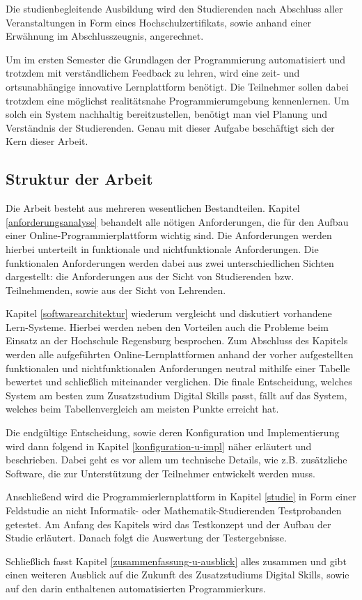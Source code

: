 Die studienbegleitende Ausbildung wird den Studierenden nach Abschluss aller
Veranstaltungen in Form eines Hochschulzertifikats, sowie anhand einer Erwähnung
im Abschlusszeugnis, angerechnet.

Um im ersten Semester die Grundlagen der Programmierung automatisiert und
trotzdem mit verständlichem Feedback zu lehren, wird eine zeit- und
ortsunabhängige innovative Lernplattform benötigt. Die Teilnehmer sollen dabei
trotzdem eine möglichst realitätsnahe Programmierumgebung kennenlernen. Um solch
ein System nachhaltig bereitzustellen, benötigt man viel Planung und Verständnis
der Studierenden. Genau mit dieser Aufgabe beschäftigt sich der Kern dieser
Arbeit.

\subsection{Struktur der Arbeit}\label{struktur-der-arbeit}
Die Arbeit besteht aus mehreren wesentlichen Bestandteilen. Kapitel
\ref{anforderungsanalyse} behandelt alle nötigen Anforderungen, die für den
Aufbau einer Online-Programmierplattform wichtig sind. Die Anforderungen werden
hierbei unterteilt in funktionale und nichtfunktionale Anforderungen. Die
funktionalen Anforderungen werden dabei aus zwei unterschiedlichen Sichten
dargestellt: die Anforderungen aus der Sicht von Studierenden bzw.
Teilnehmenden, sowie aus der Sicht von Lehrenden.

Kapitel \ref{softwarearchitektur} wiederum vergleicht und diskutiert vorhandene
Lern-Systeme. Hierbei werden neben den Vorteilen auch die Probleme
beim Einsatz an der Hochschule Regensburg besprochen. Zum Abschluss des Kapitels
werden alle aufgeführten Online-Lernplattformen anhand der vorher aufgestellten
funktionalen und nichtfunktionalen Anforderungen neutral mithilfe einer Tabelle
bewertet und schließlich miteinander verglichen. Die finale Entscheidung,
welches System am besten zum Zusatzstudium Digital Skills passt, fällt auf das
System, welches beim Tabellenvergleich am meisten Punkte erreicht hat.

Die endgültige Entscheidung, sowie deren Konfiguration und Implementierung wird
dann folgend in Kapitel \ref{konfiguration-u-impl} näher erläutert und
beschrieben. Dabei geht es vor allem um technische Details, wie z.B. zusätzliche
Software, die zur Unterstützung der Teilnehmer entwickelt werden muss.

Anschließend wird die Programmierlernplattform in Kapitel \ref{studie} in Form
einer Feldstudie an nicht Informatik- oder Mathematik-Studierenden Testprobanden
getestet. Am Anfang des Kapitels wird das Testkonzept und der Aufbau der Studie
erläutert. Danach folgt die Auswertung der Testergebnisse.

Schließlich fasst Kapitel \ref{zusammenfassung-u-ausblick} alles zusammen und
gibt einen weiteren Ausblick auf die Zukunft des Zusatzstudiums Digital Skills,
sowie auf den darin enthaltenen automatisierten Programmierkurs.